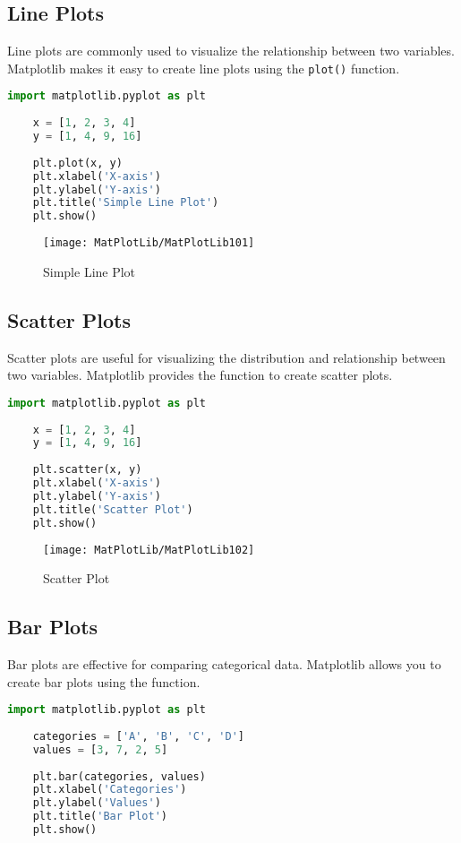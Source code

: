 \subsection{Line Plots}
Line plots are commonly used to visualize the relationship between two variables. Matplotlib makes it easy to create line plots using the \texttt{plot()} function.

\begin{lstlisting}[language=Python]
	import matplotlib.pyplot as plt
	
	x = [1, 2, 3, 4]
	y = [1, 4, 9, 16]
	
	plt.plot(x, y)
	plt.xlabel('X-axis')
	plt.ylabel('Y-axis')
	plt.title('Simple Line Plot')
	plt.show()
\end{lstlisting}

\begin{figure}[h]
	\centering
	\texttt{[image: MatPlotLib/MatPlotLib101]}
	\caption{Simple Line Plot}\label{Matplotlib01}
\end{figure}

\subsection{Scatter Plots}
Scatter plots are useful for visualizing the distribution and relationship between two variables. Matplotlib provides the  function to create scatter plots.

\begin{lstlisting}[language=Python]
	import matplotlib.pyplot as plt
	
	x = [1, 2, 3, 4]
	y = [1, 4, 9, 16]
	
	plt.scatter(x, y)
	plt.xlabel('X-axis')
	plt.ylabel('Y-axis')
	plt.title('Scatter Plot')
	plt.show()
\end{lstlisting}

\begin{figure}[h]
	\centering
	\texttt{[image: MatPlotLib/MatPlotLib102]}
	\caption{Scatter Plot}\label{Matplotlib02}
\end{figure}

\subsection{Bar Plots}
Bar plots are effective for comparing categorical data. Matplotlib allows you to create bar plots using the  function. \cite{Scipymatplotlib:2024}

\begin{lstlisting}[language=Python]
	import matplotlib.pyplot as plt
	
	categories = ['A', 'B', 'C', 'D']
	values = [3, 7, 2, 5]
	
	plt.bar(categories, values)
	plt.xlabel('Categories')
	plt.ylabel('Values')
	plt.title('Bar Plot')
	plt.show()
\end{lstlisting}

